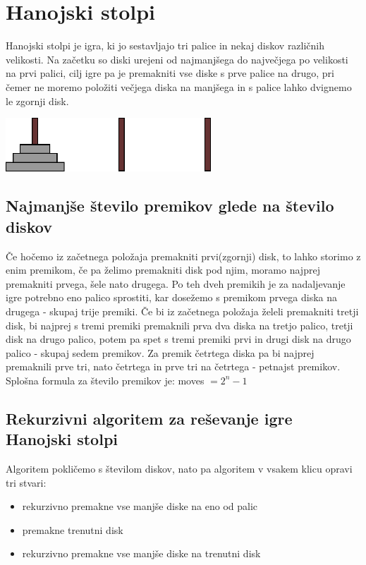 \documentclass[10pt,a4paper,oneside]{book}
\newenvironment{items}{
\begin{itemize}
  \setlength{\itemsep}{1pt}
  \setlength{\parskip}{0pt}
  \setlength{\parsep}{0pt}
}{\end{itemize}}
\begin{document}
\section{Hanojski stolpi}
Hanojski stolpi je igra, ki jo sestavljajo tri palice in nekaj diskov različnih velikosti. Na začetku so diski urejeni od najmanjšega do največjega po velikosti na prvi palici, cilj igre pa je premakniti vse diske s prve palice na drugo, pri čemer ne moremo položiti večjega diska na manjšega in s palice lahko dvignemo le zgornji disk.

\begin{center}
\includegraphics[width=77mm]{towersOfHanoi}
\end{center}

\subsection{Najmanjše število premikov glede na število diskov}
Če hočemo iz začetnega položaja premakniti prvi(zgornji) disk, to lahko storimo z enim premikom, če pa želimo premakniti disk pod njim, moramo najprej premakniti prvega, šele nato drugega. Po teh dveh premikih je za nadaljevanje igre potrebno eno palico sprostiti, kar dosežemo s premikom prvega diska na drugega - skupaj trije premiki. Če bi iz začetnega položaja želeli premakniti tretji disk, bi najprej s tremi premiki premaknili prva dva diska na tretjo palico, tretji disk na drugo palico, potem pa spet s tremi premiki prvi in drugi disk na drugo palico - skupaj sedem premikov. Za premik četrtega diska pa bi najprej premaknili prve tri, nato četrtega in prve tri na četrtega - petnajst premikov. Splošna formula za število premikov je: moves $= 2^n - 1$%
%

\subsection{Rekurzivni algoritem za reševanje igre Hanojski stolpi}
Algoritem pokličemo s številom diskov, nato pa algoritem v vsakem klicu opravi tri stvari:
\begin{items}
	\item rekurzivno premakne vse manjše diske na eno od palic
	\item premakne trenutni disk
	\item rekurzivno premakne vse manjše diske na trenutni disk
\end{items}

\end{document}

